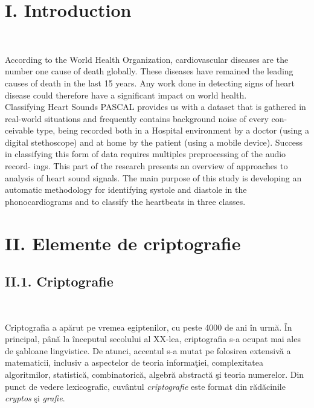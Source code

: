 \documentclass[11pt]{report}
\theoremstyle{plain}
\theoremstyle{definition}
\theoremstyle{definition}
\theoremstyle{proposition}
\begin{document}
\tableofcontents

\newpage

\chapter*{I. Introduction}

\

According to the World Health Organization, cardiovascular diseases are the
number one cause of death globally. These diseases have remained the leading
causes of death in the last 15 years. Any work done in detecting signs of heart
disease could therefore have a significant impact on world health.
\\

Classifying Heart Sounds PASCAL provides us with a dataset that is gathered
in real-world situations and frequently contains background noise of every con-
ceivable type, being recorded both in a Hospital environment by a doctor (using a
digital stethoscope) and at home by the patient (using a mobile device). Success in
classifying this form of data requires multiples preprocessing of the audio record-
ings. This part of the research presents an overview of approaches to analysis of
heart sound signals. The main purpose of this study is developing an automatic
methodology for identifying systole and diastole in the phonocardiograms and to
classify the heartbeats in three classes.
\\


\newpage

\chapter*{II. Elemente de criptografie}

\section*{II.1. Criptografie}

\

Criptografia a apărut pe vremea egiptenilor, cu peste 4000 de ani în urmă. În principal, până la începutul secolului al XX-lea, criptografia s-a ocupat mai ales de şabloane lingvistice. De atunci, accentul s-a mutat pe folosirea extensivă a matematicii, inclusiv a aspectelor de teoria informaţiei, complexitatea algoritmilor, statistică, combinatorică, algebră abstractă şi teoria numerelor. Din punct de vedere lexicografic, cuvântul \textit{criptografie} este format din rădăcinile \textit{cryptos} şi \textit{grafie}.
\end{document}
